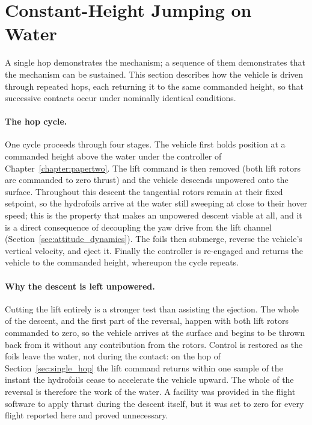 \section{Constant-Height Jumping on Water}
\label{sec:constant_height_jumping}

A single hop demonstrates the mechanism; a sequence of them demonstrates that
the mechanism can be sustained.  This section describes how the vehicle is
driven through repeated hops, each returning it to the same commanded height,
so that successive contacts occur under nominally identical conditions.

\paragraph{The hop cycle.}
One cycle proceeds through four stages.  The vehicle first holds position at a
commanded height above the water under the controller of
Chapter~\ref{chapter:papertwo}.  The lift command is then removed (both lift rotors are commanded to zero thrust) and the vehicle descends unpowered onto
the surface.  Throughout this descent the tangential rotors remain at their
fixed setpoint, so the hydrofoils arrive at the water still sweeping at close
to their hover speed; this is the property that makes an unpowered descent
viable at all, and it is a direct consequence of decoupling the yaw drive from
the lift channel (Section~\ref{sec:attitude_dynamics}).  The foils then
submerge, reverse the vehicle's vertical velocity, and eject it.  Finally the
controller is re-engaged and returns the vehicle to the commanded height,
whereupon the cycle repeats.

\paragraph{Why the descent is left unpowered.}
Cutting the lift entirely is a stronger test than assisting the ejection.  The
whole of the descent, and the first part of the reversal, happen with both
lift rotors commanded to zero, so the vehicle arrives at the surface and
begins to be thrown back from it without any contribution from the rotors.
Control is restored as the foils leave the water, not during the contact: on
the hop of Section~\ref{sec:single_hop} the lift command returns within one
sample of the instant the hydrofoils cease to accelerate the vehicle upward.
The whole of the reversal is therefore the work of the water.  A facility was provided in
the flight software to apply thrust during the descent itself, but it was set
to zero for every flight reported here and proved unnecessary.


